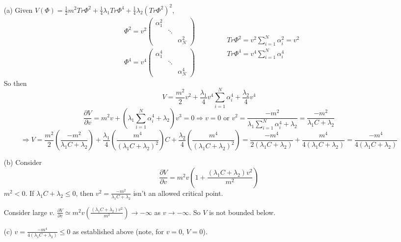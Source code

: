 \documentclass[twoside]{amsart}
\newcommand{\solutionhead}[1]
  {\smallskip
   \noindent{\large\bf Solution #1.}
   }
\begin{document}
\solutionhead{84.1}
\begin{enumerate}
\item[(a)] Given $V(\Phi) = \frac{1}{2} m^2 Tr{ \Phi^2} + \frac{1}{4} \lambda_1 Tr{ \Phi^4} + \frac{1}{4} \lambda_2 (Tr{ \Phi^2 })^2 $, 
\[
\begin{aligned}
  & \Phi^2 = v^2 \left( \begin{matrix} \alpha_1^2 & & \\ & \ddots & \\ &  & \alpha_N^2 \end{matrix} \right) \\ 
  &  \Phi^4 = v^4 \left( \begin{matrix} \alpha_1^4 & & \\ & \ddots & \\ &  & \alpha_N^4 \end{matrix} \right) 
\end{aligned} \quad \quad \quad 
\begin{aligned}
&  Tr{ \Phi^2 } = v^2 \sum_{i=1}^N \alpha_i^2 = v^2 \\ 
&  Tr{ \Phi^4 } = v^4 \sum_{i=1}^N \alpha_i^4
\end{aligned}
\]
So then
\[
V = \frac{m^2}{2} v^2 + \frac{ \lambda_1}{4} v^4 \sum_{i=1}^N \alpha_i^4 + \frac{\lambda_2}{4} v^4
\]
\[
\frac{ \partial V}{\partial v} = m^2 v + ( \lambda_1 \sum_{i=1}^N \alpha_i^4 + \lambda_2) v^3 = 0 \Longrightarrow v= 0 \text{ or } v^2 = \frac{ -m^2 }{ \lambda_1 \sum_{i=1}^N \alpha_i^4 + \lambda_2 } = \frac{ -m^2}{ \lambda_1 C + \lambda_2 } 
\]
\[
\Longrightarrow V = \frac{m^2}{2} \left( \frac{ -m^2 }{ \lambda_1 C + \lambda_2 } \right) + \frac{ \lambda_1}{4} \left( \frac{m^4}{ (\lambda_1 C + \lambda_2)^2 } \right) C + \frac{ \lambda_2}{4} \left( \frac{ m^4}{ (\lambda_1 C + \lambda_2)^2 } \right) = \frac{ -m^4}{ 2 (\lambda_1 C + \lambda_2 ) } + \frac{ m^4}{ 4 (\lambda_1 C + \lambda_2) } = \boxed{ \frac{ -m^4}{ 4 (\lambda_1 C + \lambda_2 ) } }
\]
\item[(b)] Consider 
\[
\frac{ \partial V}{ \partial v} = m^2 v \left( 1 + \frac{ (\lambda_1 C + \lambda_2) v^2 }{ m^2 } \right)
\]
$m^2 <0$.  If $\lambda_1 C + \lambda_2 \leq 0$, then $v^2 = \frac{-m^2}{ \lambda_1 C + \lambda_2 }$ isn't an allowed critical point.  

Consider large $v$.  $\frac{ \partial V}{ \partial v} \simeq m^2 v \left( \frac{ (\lambda_1 C + \lambda_2) v^2}{ m^2} \right) \to -\infty$ as $v\to -\infty$.  So $V$ is not bounded below.  
\item[(c)] $v = \frac{-m^4}{ 4(\lambda_1 C + \lambda_2 )} \leq 0$ as established above (note, for $v=0$, $V=0$).  


\end{enumerate}
\end{document}
